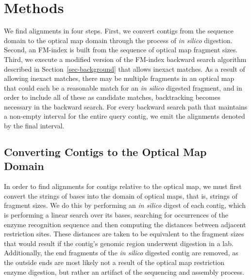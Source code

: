 
\section{Methods}
\label{sec-methods}



We find alignments in four steps.  First, we convert contigs from the sequence domain to the optical map domain through the process of {\em in silico} digestion. Second, an FM-index is built from the sequence of optical map fragment sizes. Third, we execute a modified version of the FM-index backward search algorithm described in Section~\ref{sec-background} that allows inexact matches.
As a result of allowing inexact matches, there may be multiple fragments in an optical map that could each be a reasonable match for an {\em in silico} digested fragment, and in order to include all of these as candidate matches, backtracking becomes necessary in the backward search.
For every backward search path that maintains a non-empty interval for the entire query contig, we emit the alignments denoted by the final interval.%


\subsection{Converting Contigs to the Optical Map Domain}

In order to find alignments for contigs relative to the optical map, we must first convert the strings of bases into the domain of optical maps, that is, strings of fragment sizes.
We do this by performing an {\em in silico} digest of each contig, which is performing a linear search over its bases, searching for occurrences of the enzyme recognition sequence and then computing the distances between adjacent restriction sites. 
These distances are taken to be equivalent to the fragment sizes that would result if the contig's genomic region underwent digestion in a lab.  
Additionally, the end fragments of the {\em in silico} digested contig are removed, as the outside ends are most likely not a result of the optical map restriction enzyme digestion, but rather an artifact of the sequencing and assembly process.


